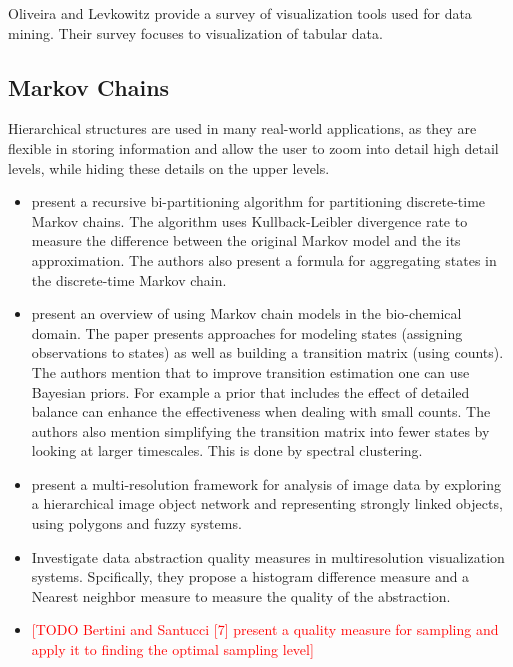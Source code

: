 Oliveira and Levkowitz \cite{1207445} provide a survey of visualization tools used for data mining. Their survey focuses
to visualization of tabular data.

\subsection{Markov Chains}

Hierarchical structures are used in many real-world applications, as they are flexible in storing information
and allow the user to zoom into detail high detail levels, while hiding these details on the upper levels.

\begin{itemize}
	\item \cite{5746509} present a recursive bi-partitioning algorithm for partitioning discrete-time Markov chains. The 
	algorithm uses Kullback-Leibler divergence rate to measure the difference between the original Markov
	model and the its approximation. The authors also present a formula for aggregating states in the discrete-time
	Markov chain.
	
	\item \cite{pande-beauchamp-bowman:2010:methods:markov-model-review} present an overview of using Markov chain models in the bio-chemical domain. The paper
	presents approaches for modeling states (assigning observations to states) as well as building a transition
	matrix (using counts). The authors mention that to improve transition estimation one can use Bayesian priors.
	For example a prior that includes the effect of detailed balance can enhance the effectiveness when dealing with
	small counts. The authors also mention simplifying the transition matrix into fewer states by looking at larger
	timescales. This is done by spectral clustering.
	
	\item \cite{Benz2004239} present a multi-resolution framework for analysis of image data by exploring a hierarchical
	image object network and representing strongly linked objects, using polygons and fuzzy systems.
	
	\item \cite{4015421} Investigate data abstraction quality measures in multiresolution visualization systems. Spcifically, they propose
	a histogram difference measure and a Nearest neighbor measure to measure the quality of the abstraction.
	
	\item \textcolor{red}{[TODO Bertini and Santucci [7] present a quality measure for sampling and apply it to finding the optimal sampling level]}
	

\end{itemize}

